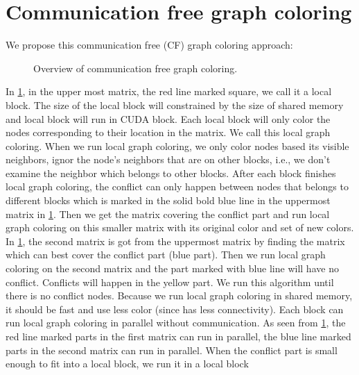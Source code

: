 \documentclass[12pt] {article}
\begin{document}
\section*{Communication free graph coloring}
We propose this communication free (CF) graph coloring approach:
\begin{figure}[!tbh]
\centering        
   \caption{Overview of communication free graph coloring.}
   \label{fig:fig2}
\end{figure} 
In \ref{fig:fig2}, in the upper most matrix, the red line marked square, we call it a local block. The size of the local block will constrained by the size of shared memory and local block will run in CUDA block. Each local block will only color the nodes corresponding to their location in the matrix. We call this local graph coloring. 
When we run local graph coloring, we only color nodes based its visible neighbors, ignor the node's neighbors that are on other blocks, i.e., we don't examine the neighbor which belongs to other blocks. After each block finishes local graph coloring, the conflict can only happen between nodes that belongs to different blocks which is marked in the solid bold blue line in the uppermost matrix in \ref{fig:fig2}. Then we get the matrix covering the conflict part and run local graph coloring on this smaller matrix with its original color and set of new colors. In \ref{fig:fig2}, the second matrix is got from the uppermost matrix by finding the matrix which can best cover the conflict part (blue part). Then we run local graph coloring on the second matrix and the part marked with blue line will have no conflict. Conflicts will happen in the yellow part. We run this algorithm until there is no conflict nodes.  
Because we run local graph coloring in shared memory, it should be fast and use less color (since has less connectivity). Each block can run local graph coloring in parallel without communication. As seen from \ref{fig:fig2}, the red line marked parts in the first matrix can run in parallel, the blue line marked parts in the second matrix can run in parallel. When the conflict part is small enough to fit into a local block, we run it in a local block 
\end{document}

